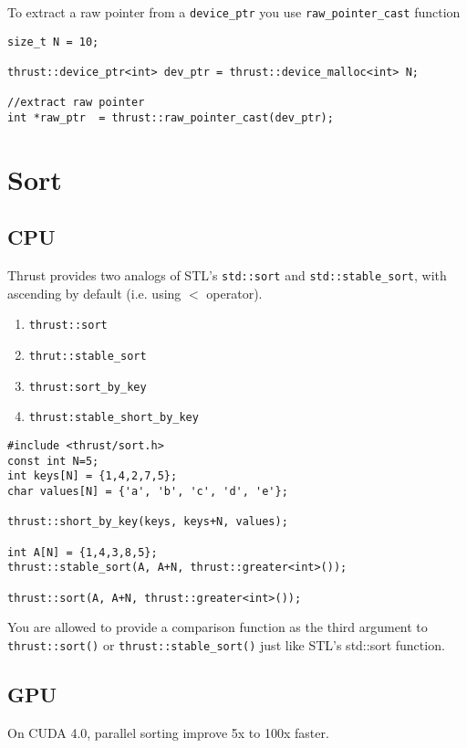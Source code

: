 To extract a raw pointer from a \verb!device_ptr! you use
\verb!raw_pointer_cast! function
\begin{lstlisting}
size_t N = 10;

thrust::device_ptr<int> dev_ptr = thrust::device_malloc<int> N;

//extract raw pointer
int *raw_ptr  = thrust::raw_pointer_cast(dev_ptr);

\end{lstlisting}

\section{Sort}

\subsection{CPU}

Thrust provides two analogs of STL's \verb!std::sort! and
\verb!std::stable_sort!, with ascending by default (i.e. using $<$ operator).

\begin{enumerate}
\item  \verb!thrust::sort!
\item \verb!thrut::stable_sort!
\item \verb!thrust:sort_by_key!
\item \verb!thrust:stable_short_by_key!
\end{enumerate}

\begin{lstlisting}
#include <thrust/sort.h>
const int N=5;
int keys[N] = {1,4,2,7,5};
char values[N] = {'a', 'b', 'c', 'd', 'e'};

thrust::short_by_key(keys, keys+N, values);

int A[N] = {1,4,3,8,5};
thrust::stable_sort(A, A+N, thrust::greater<int>());

thrust::sort(A, A+N, thrust::greater<int>());
\end{lstlisting}

You are allowed to provide a comparison function as the third argument
to \verb!thrust::sort()! or \verb!thrust::stable_sort()! just like
STL's std::sort function. 

\subsection{GPU}

On CUDA 4.0, parallel sorting improve 5x to 100x faster.

